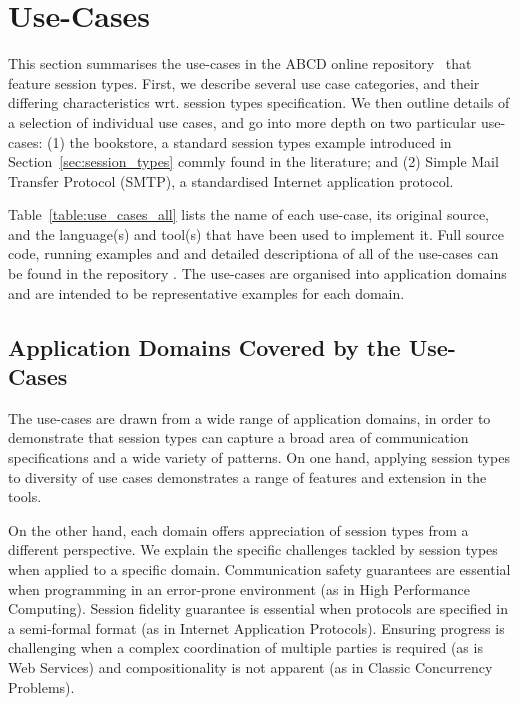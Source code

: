 
\section{Use-Cases}
\label{sec:usecases}

This section summarises the use-cases in the ABCD online repository~\cite{usecase_repository} that feature session types. First,  we describe several use case categories, and their differing characteristics wrt. session types specification.  We then outline details of a selection of individual use cases, and go into more depth on two particular use-cases: (1) the bookstore, a standard session types example introduced in Section~\ref{sec:session_types} commly found in the literature; and (2) Simple Mail Transfer Protocol (SMTP), a standardised Internet application protocol.

Table~\ref{table:use_cases_all} lists the name of each use-case, its original source, and the language(s) and tool(s) that have been used to implement it. Full source code, running examples and and detailed descriptiona of all of the use-cases can be found in the repository \cite{usecase_repository}.  The use-cases are organised into application domains and are intended to be representative examples for each domain.




\subsection{Application Domains Covered by the Use-Cases}

The use-cases are drawn from a wide range of
application domains, in order to demonstrate that
session types can capture
a broad area of communication specifications and a wide variety of patterns. On  one hand, applying session types to diversity of use cases demonstrates a range of features and extension in the tools. 

On the other  hand, each domain offers appreciation of session types from a different perspective. We explain the specific challenges tackled by session types when applied to a specific domain.   %
Communication safety guarantees are essential when programming in an error-prone environment (as in High Performance Computing). Session fidelity guarantee is essential when protocols are specified in a semi-formal format (as in Internet Application Protocols). Ensuring progress is challenging when a complex coordination of multiple parties is required (as is Web Services) and compositionality is not apparent (as in Classic Concurrency Problems).

